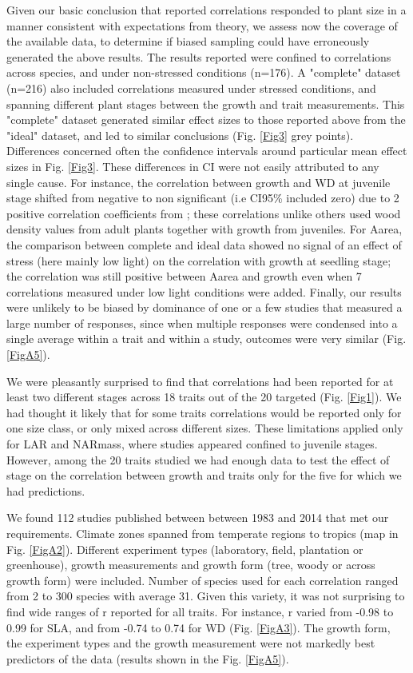 \documentclass[a4paper]{article}\usepackage[]{graphicx}\usepackage[]{color}
\begin{document}
Given our basic conclusion that reported correlations responded to plant size in a manner consistent with expectations from theory, we assess now the coverage of the available data, to determine if biased sampling could have erroneously generated the above results. The results reported were confined to correlations across species, and under non-stressed conditions (n=176). A "complete" dataset (n=216) also included correlations measured under stressed conditions, and spanning different plant stages between the growth and trait measurements. This "complete" dataset generated similar effect sizes to those reported above from the "ideal" dataset, and led to similar conclusions (Fig. \ref{Fig3} grey points). Differences concerned often the confidence intervals around particular mean effect sizes in Fig. \ref{Fig3}. These differences in CI were not easily attributed to any single cause. For instance, the correlation between growth and WD at juvenile stage shifted from negative to non significant (i.e CI95\% included zero) due to 2 positive correlation coefficients from \citet{Augspurger:1984ct};  these correlations unlike others used wood density values from adult plants together with growth from juveniles. For Aarea, the comparison between complete and ideal data showed no signal of an effect of stress (here mainly low light) on the correlation with growth at seedling stage; the correlation was still positive between Aarea and growth even when 7 correlations measured under low light conditions were added. Finally, our results were unlikely to be biased by dominance of one or a few studies that measured a large number of responses, since when multiple responses were condensed into a single average within a trait and within a study, outcomes were very similar (Fig. \ref{FigA5}).

We were pleasantly surprised to find that correlations had been reported for at least two different stages across 18 traits out of the 20 targeted (Fig. \ref{Fig1}). We had thought it likely that for some traits correlations would be reported only for one size class, or only mixed across different sizes. These limitations applied only for LAR and NARmass, where studies appeared confined to juvenile stages. However, among the 20 traits studied we had enough data to test the effect of stage on the correlation between growth and traits only for the five for which we had predictions. 

We found 112 studies published between between 1983 and 2014 that met our requirements. Climate zones spanned from temperate regions to  tropics (map in Fig. \ref{FigA2}). Different experiment types (laboratory, field, plantation or greenhouse), growth measurements and growth form (tree, woody or across growth form) were included. Number of species used for each correlation ranged from 2 to 300 species with average 31. Given this variety, it was not surprising to find wide ranges of r reported for all traits. For instance, r varied from -0.98 to 0.99 for SLA, and from -0.74 to 0.74 for WD (Fig. \ref{FigA3}). The growth form, the experiment types and the growth measurement were not markedly best predictors of the data (results shown in the Fig. \ref{FigA5}). 
\end{document}
